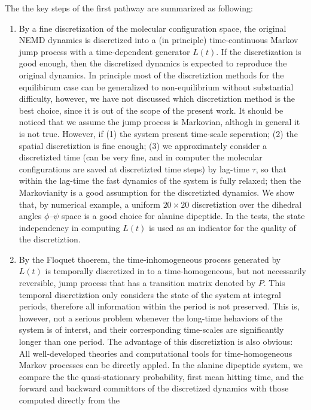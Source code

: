 \documentclass[aps, pre, preprint,unsortedaddress,a4paper,onecolumn]{revtex4}
\newcommand{\recheck}[1]{{\color{red} #1}}
\begin{document}
The the key steps of the first pathway are
summarized as following:
\begin{enumerate}
\item By a fine discretization of the molecular configuration space,
  the original NEMD dynamics is discretized into a (in principle)
  time-continuous \recheck{Markov} jump process with a time-dependent generator $L(t)$.
  If the discretization is good enough, then the discretized
  dynamics is expected to reproduce the original dynamics.
  In principle most of the discretiztion methods for the
  equilibirum case can be generalized to  non-equilibrium without
  substantial difficulty, however,
  we have not discussed which discretiztion method is the best choice,
  since it is out of the scope of the present work.
  \recheck{It should be noticed that
    we assume the jump process is Markovian, althogh in
    general it is not true. However, if (1) the system present time-scale
    seperation; (2) the spatial discretiztion is fine enough; (3)
    we approximately consider a discretizted time
    (can be very fine, and in computer the molecular configurations are
    saved at discretizted time steps)
    by lag-time $\tau$, so that within the lag-time
    the fast dynamics of the system is fully relaxed; then
    the Markovianity is a good assumption for the discretizted dynamics.
  }
  We show that, by numerical example, a uniform $20\times20$ discretiztion 
  over the dihedral angles $\phi$--$\psi$ space is a good choice for
  alanine dipeptide.
  In the tests, the state independency in computing $L(t)$
  is used as an indicator for
  the quality of the discretiztion.
\item By the Floquet thoerem, the time-inhomogeneous process generated
  by $L(t)$ is temporally discretized in to a time-homogeneous,
  but not necessarily reversible, jump process that has a transition
  matrix denoted by $P$. This temporal discretiztion only  considers
  the state of the system at integral periods, therefore all information
  within the period is not preserved. This is, however, not a serious
  problem whenever the long-time hehaviors of the system is of interst, and
  their corresponding time-scales are significantly longer than one period.
  The advantage of this discretiztion
  is also obvious: All well-developed theories and computational tools
  for time-homogeneous Markov processes
  can be directly appled. In the
  alanine dipeptide system, we compare
  the the quasi-stationary probability,
  first mean hitting time, and the forward and backward committors
  of the discretized dynamics with those computed directly from the

\end{enumerate}
\end{document}
